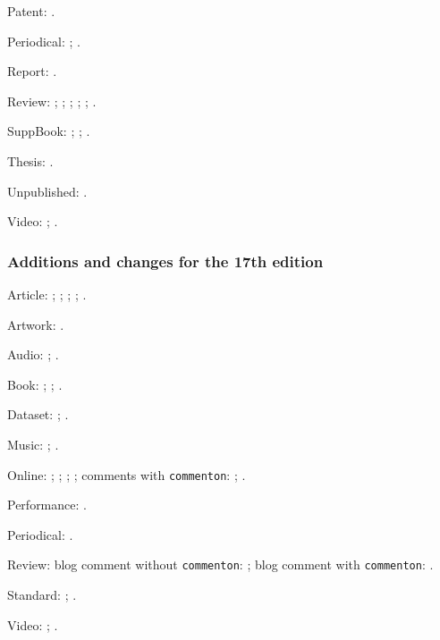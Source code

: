 \documentclass[a4paper,12pt]{report}
\begin{document}
Patent: \autocite{petroff:impurity}.

Periodical: \autocite{good:wholeissue}; \autocite{whittington:water}.

Report: \autocite{herwign:office}.

Review: \autocite{ac:comment:trad}; \autocite{bundy:macneil};
\autocite{Clemens:letter}; \autocite{kozinn:review};
\autocite{ratliff:review:15}; \autocite{wallraff:word}.

SuppBook: \autocite{friedman:intro}; \autocite{polakow:afterw};
\autocite{prose:intro}.

Thesis: \autocite{murphy:silent:15}.

Unpublished: \autocite{nass:address}.

Video: \autocite{cleese:holygrail}; \autocite{hitchcock:nbynw}.

\subsubsection*{Additions and changes for the 17th edition}
\label{ed17}

Article: \autocite{amlen:hoot}; \autocite{black:infectious};
\autocite{kessler:nyt}; \autocite{saberhagen:beluga};
\autocite{stoffle:ghost}.

Artwork: \autocite{mccurry:afghangirl}.

Audio: \autocite{danforth:podcast}; \autocite{strayed:audiobook}.

Book: \autocite{angry:birds}; \autocite{gems:ipad};
\autocite{gems:print}.

Dataset: \autocite{genbank:db}; \autocite{nasa:db}.

Music: \autocite{naraya}; \autocite{rihanna:umbrella}.

Online: \autocite{diaz:surprise}; \autocite{obrien:recycle};
\autocite{quora:thread}; \autocite{souza:obama}; comments with
\texttt{commenton}: \autocites{braun:reply}{quora:thread-customc};
\autocites{licis:diazcomment}{diaz:surprise-customc}.

Performance: \autocite{hamilton:miranda}.

Periodical: \autocite{amlen:wordplay}.

Review: blog comment without \texttt{commenton}:
\autocite{viv:amlen:15}; blog comment with \texttt{commenton}:
\autocites{ac:comment}{ellis:blog-customc}.

Standard: \autocite{niso:bibref}; \autocite{w3c:xml}.

Video: \autocite{american:crime}; \autocite{mayberry:brady}.

\printbibliography[notkeyword=nosample,title=References]
\end{document}
